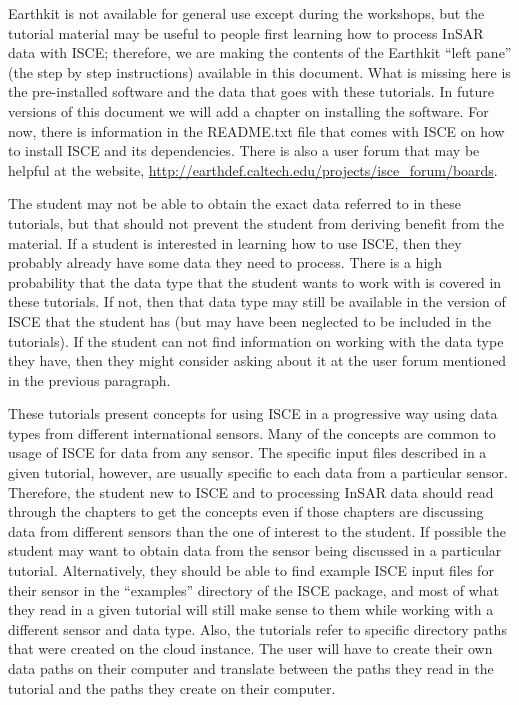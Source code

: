 \documentclass[11pt]{book}
\begin{document}
Earthkit is not available for general use except during the workshops, but the tutorial
material may be useful to people first learning how to process InSAR data with ISCE; therefore,
we are making the contents of the Earthkit ``left pane'' (the step by step instructions)
available in this document. What is missing here is the pre-installed software and the data that
goes with these tutorials.  In future versions of this document we will add a chapter on
installing the software.  For now, there is information in the README.txt file that comes
with ISCE on how to install ISCE and its dependencies.  There is also a user forum that may
be helpful at the website, \url{http://earthdef.caltech.edu/projects/isce_forum/boards}.

The student may not be able to obtain the exact data referred to in these tutorials, but that
should not prevent the student from deriving benefit from the material. If a student is interested
in learning how to use ISCE, then they probably already have some data they need to process. There
is a high probability that the data type that the student wants to work with is covered in these
tutorials.  If not, then that data type may still be available in the version of ISCE that the
student has (but may have been neglected to be included in the tutorials).  If the student can not
find information on working with the data type they have, then they might consider asking about it
at the user forum mentioned in the previous paragraph.

These tutorials present concepts for using ISCE in a progressive way using data types from different
international sensors.  Many of the concepts are common to usage of ISCE for data from any sensor.
The specific input files described in a given tutorial, however, are usually specific to each data
from a particular sensor.  Therefore, the student new to ISCE and to processing InSAR data should read
through the chapters to get the concepts even if those chapters are discussing data from different
sensors than the one of interest to the student.  If possible the student may want to obtain data
from the sensor being discussed in a particular tutorial.  Alternatively, they should be able to find
example ISCE input files for their sensor in the ``examples'' directory of the ISCE package, and most
of what they read in a given tutorial will still make sense to them while working with a different
sensor and data type.  Also, the tutorials refer to specific directory paths that were created on the
cloud instance.  The user will have to create their own data paths on their computer and translate
between the paths they read in the tutorial and the paths they create on their computer.
\end{document}
